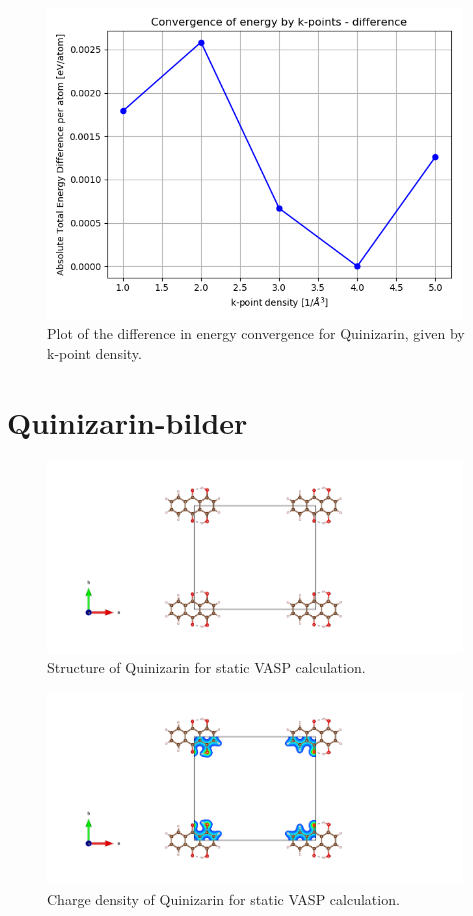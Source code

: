 \documentclass{article}
\begin{document}
  \begin{figure}[H]
      \centering
      \includegraphics[width = 11cm]{../fig/convergence_kpoints_difference.png}
      \caption{Plot of the difference in energy convergence for Quinizarin, given by k-point density. }
      \label{fig:convergence_kpoints_difference.png}
  \end{figure}

\vspace{1cm}

\section{Quinizarin-bilder}

  \begin{figure}[H]
      \centering
      \includegraphics[width = 11cm]{../fig/basic_staticbefore_CONTCAR.png}
      \caption{Structure of Quinizarin for static VASP calculation. }
      \label{fig:basic_staticbefore_CONTCAR}
  \end{figure}

  \begin{figure}[H]
      \centering
      \includegraphics[width = 11cm]{../fig/basic_staticbefore_CHGCAR.png}
      \caption{Charge density of Quinizarin for static VASP calculation. }
      \label{fig:basic_staticbefore_CHGCAR}
  \end{figure}
\end{document}

